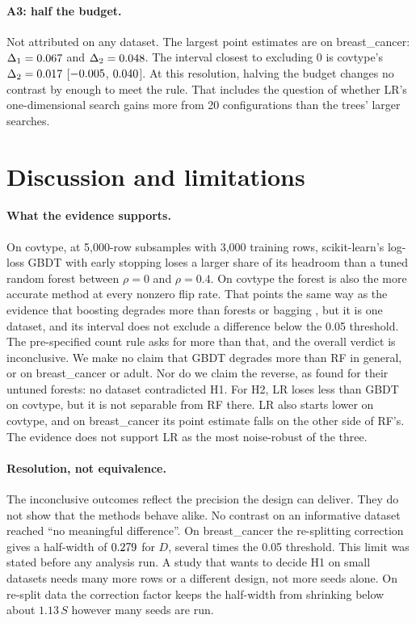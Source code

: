 \documentclass[11pt]{article}
\newcommand{\ds}[1]{\textsf{#1}}
\newcommand{\bc}{\ds{breast\_cancer}}
\newcommand{\ad}{\ds{adult}}
\newcommand{\ct}{\ds{covtype}}
\begin{document}
\paragraph{A3: half the budget.} Not attributed on any dataset. The largest point
estimates are on \bc: $\Delta_1 = 0.067$ and $\Delta_2 = 0.048$. The interval
closest to excluding 0 is \ct's $\Delta_2 = 0.017$ [$-0.005$,
$0.040$]. At this resolution, halving the budget changes no contrast by
enough to meet the rule. That includes the question of whether LR's one-dimensional search
gains more from 20 configurations than the trees' larger searches.

\section{Discussion and limitations}
\label{sec:discussion}

\paragraph{What the evidence supports.} On \ct, at 5,000-row subsamples with 3,000 training
rows, scikit-learn's log-loss GBDT with early stopping loses a larger share of its headroom
than a tuned random forest between $\rho=0$ and $\rho=0.4$. On \ct{} the forest is also the
more accurate method at every nonzero flip rate. That points the same way as the evidence
that boosting degrades more than forests or bagging \citep{dietterich2000,breiman2001,
nawaz2025}, but it is one dataset, and its interval does not exclude a difference below
the 0.05 threshold. The pre-specified count rule asks for more than that,
and the overall verdict is inconclusive. We make no claim that GBDT degrades more than RF in
general, or on \bc{} or \ad. Nor do we claim the reverse, as \citet{lebaher2020} found for
their untuned forests: no dataset contradicted H1. For H2, LR loses less than GBDT on \ct, but
it is not separable from RF there. LR also starts lower on \ct, and on \bc{} its point
estimate falls on the other side of RF's. The evidence does not support LR as the most
noise-robust of the three.

\paragraph{Resolution, not equivalence.} The inconclusive outcomes reflect the precision the
design can deliver. They do not show that the methods behave alike. No contrast on an
informative dataset reached ``no meaningful difference''. On \bc{} the re-splitting
correction gives a half-width of $0.279$ for $D$, several times the 0.05 threshold.
This limit was stated before any analysis run. A study that wants to decide H1 on small datasets
needs many more rows or a different design, not more seeds alone. On re-split data the
correction factor keeps the half-width from shrinking below about $1.13\,S$ however many
seeds are run.
\end{document}
